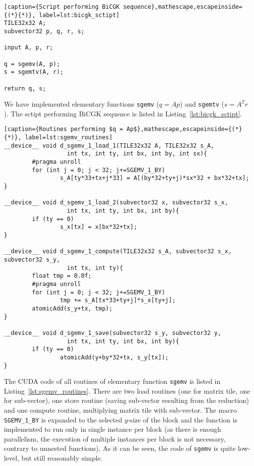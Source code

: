 \documentclass[final]{siamltex}
\begin{document}
{\begin{lstlisting}[caption={Script performing BiCGK sequence},mathescape,escapeinside={(*}{*)}, label=lst:bicgk_sctipt]
TILE32x32 A;
subvector32 p, q, r, s;

input A, p, r;

q = sgemv(A, p);
s = sgemtv(A, r);

return q, s;
\end{lstlisting}

We have implemented elementary functions \texttt{sgemv} ($q = Ap$) and \texttt{sgemtv} ($s = A^Tr$). The sctipt performing BiCGK sequence is listed in Listing~\ref{lst:bicgk_sctipt}.

\begin{lstlisting}[caption={Routines performing $q = Ap$},mathescape,escapeinside={(*}{*)}, label=lst:sgemv_routines]
__device__ void d_sgemv_1_load_1(TILE32x32 A, TILE32x32 s_A, 
                  int tx, int ty, int bx, int by, int sx){
        #pragma unroll
        for (int j = 0; j < 32; j+=SGEMV_1_BY)
                s_A[ty*33+tx+j*33] = A[(by*32+ty+j)*sx*32 + bx*32+tx];
}

__device__ void d_sgemv_1_load_2(subvector32 x, subvector32 s_x, 
                  int tx, int ty, int bx, int by){
        if (ty == 0)
                s_x[tx] = x[bx*32+tx];
}

__device__ void d_sgemv_1_compute(TILE32x32 s_A, subvector32 s_x, subvector32 s_y, 
                  int tx, int ty){
        float tmp = 0.0f;
        #pragma unroll
        for (int j = 0; j < 32; j+=SGEMV_1_BY)
                tmp += s_A[tx*33+ty+j]*s_x[ty+j];
        atomicAdd(s_y+tx, tmp);
}

__device__ void d_sgemv_1_save(subvector32 s_y, subvector32 y, 
                  int tx, int ty, int bx, int by){
        if (ty == 0)
                atomicAdd(y+by*32+tx, s_y[tx]);
}
\end{lstlisting}

The CUDA code of all routines of elementary function \texttt{sgemv} is listed in Listing~\ref{lst:sgemv_routines}. There are two load routines (one for matrix tile, one for sub-vector), one store routine (saving sub-vector resulting from the reduction) and one compute routine, multiplying matrix tile with sub-vector. The macro \texttt{SGEMV\_1\_BY} is expanded to the selected $y$-size of the block and the function is implemented to run only in single instance per block (as there is enough parallelism, the execution of multiple instances per block is not necessary, contrary to unnested functions). As it can be seen, the code of \texttt{sgemv} is quite low-level, but still reasonably simple.

}
\end{document}
